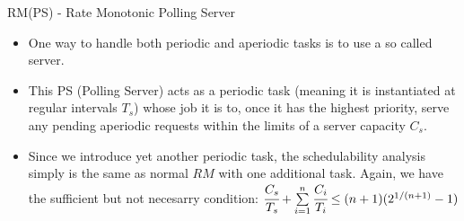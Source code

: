 \begin{frame}{RM(PS) - Rate Monotonic Polling Server}
    \begin{itemize}
        \item One way to handle both periodic and aperiodic tasks is to use a so called server.
        \item This PS (Polling Server) acts as a periodic task (meaning it is instantiated at regular intervals $T_s$) whose job it is to, once it has the highest priority, serve any pending aperiodic requests within the limits of a server capacity $C_s$.
        \item Since we introduce yet another periodic task, the schedulability analysis simply is the same as normal $RM$ with one additional task. Again, we have the \alert{sufficient} but not \alert{necesarry} condition: $\cfrac{C_s}{T_s} + \sum\limits_{i=1}^{n}\cfrac{C_i}{T_i} \leq (n+1)(2^{1/(n+1)}-1)$
    \end{itemize}
\end{frame}

%


